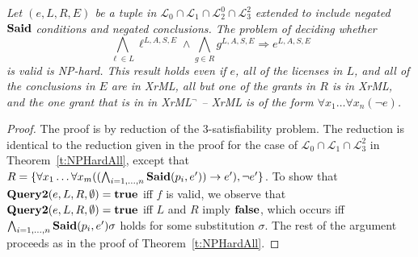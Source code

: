 \documentclass{acmtrans2m}
\newcommand{\prf}{\begin{proof}}
\newcommand{\eprf}{\end{proof}}
\newenvironment{RETHM}[2]{\trivlist \item[\hskip 10pt\hskip\labelsep{\sc #1\hskip 5pt\relax\ref{#2}.}]\it}{\endtrivlist}
\newcommand{\rethm}[1]{\begin{RETHM}{Theorem}{#1}}
\newcommand{\erethm}{\end{RETHM}}
\newcommand{\rimp}{\Rightarrow}
\newcommand{\othm}{\rethm}
\newcommand{\eothm}{\erethm}
\newcommand{\<}{
}
\renewcommand{\>}{\rangle}
\newcommand{\inter}{\cap}
\newcommand{\cL}{\mathcal{L}}
\newcommand{\Said}{\mathit{\bf Said}}
\newcommand{\true}{\mathit{\bf{true}}}
\newcommand{\false}{\mathit{\bf{false}}}
\newcommand{\scd}{S}
\newcommand{\cc}{e}
\newcommand{\scc}{E}
\newcommand{\imp}{\rightarrow}
\newcommand{\XProcTwo}{\textbf{Query2}}
\newcommand{\tranwithE}[1]{#1^{L, A, \scd, \scc}}
\begin{document}
\othm{t:ext1}
Let $(\cc, L, R, \scc)$ be a tuple in $\cL_0\cap\cL_1\cap\cL_2^0\cap\cL_3^2$ extended to
include negated $\Said$ conditions and negated conclusions.  The problem of deciding whether
$$
\bigwedge_{\ell\in L} \tranwithE{\ell} \land \bigwedge_{g\in R} \tranwithE{g}\rimp\tranwithE{\cc}
$$
is valid is NP-hard.  This result holds even if $\cc$, all of the licenses in $L$, and all
of the conclusions in $\scc$ are in XrML, all but one of the grants in $R$ is in XrML, and
the one grant that is in in XrML$^\neg$ -- XrML is of the form
$\forall x_1\ldots\forall x_n(\neg \cc)$.
\eothm
\prf
The proof is by reduction of the 3-satisfiability problem.  The reduction is identical to the
reduction given in the proof for the case of $\cL_0\inter\cL_1 \inter \cL_3^2$ in
Theorem~\ref{t:NPHardAll}, except that
$R = \{\forall x_1 \ldots\forall x_m((\bigwedge_{i= 1, \ldots, n}\Said(p_i, \cc'))\imp\cc'), \neg\cc'\}$.
To show that $\XProcTwo(\cc, L, R, \emptyset) = \true$ iff $f$ is valid, we observe that
$\XProcTwo(\cc, L, R, \emptyset) = \true$ iff $L$ and $R$ imply $\false$, which occurs iff
$\bigwedge_{i= 1, \ldots, n}\Said(p_i, \cc')\sigma$ holds for some substitution $\sigma$.  The rest of
the argument proceeds as in the proof of Theorem~\ref{t:NPHardAll}.
\eprf



\end{document}
